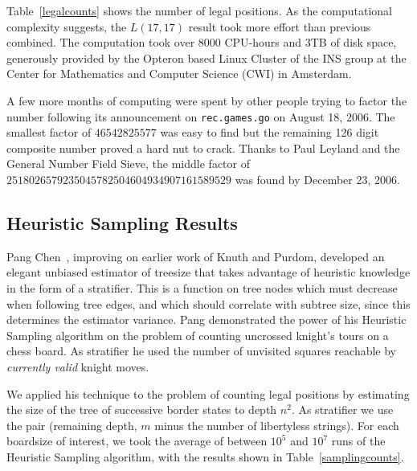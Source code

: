 \documentclass{article}
\begin{document}
Table~\ref{legalcounts} shows the number of legal positions.
As the computational complexity suggests, the $L(17,17)$ result
took more effort than previous combined.
The computation took over 8000 CPU-hours and 3TB of disk space,
generously provided by the Opteron based Linux Cluster of the INS group
at the Center for Mathematics and Computer Science (CWI) in Amsterdam.

A few more months of computing were spent by other people trying to
factor the number following its announcement on {\tt rec.games.go} on
August 18, 2006.
The smallest factor of $46542825577$ was easy to find but the remaining
126 digit composite number proved a hard nut to crack.
Thanks to Paul Leyland and the General Number Field
Sieve, the middle factor of $2518026579235045782504604934907161589529$
was found by December 23, 2006.

\subsection{Heuristic Sampling Results}
Pang Chen~\cite{C92}, improving on earlier work of Knuth and Purdom,
developed an elegant unbiased estimator of treesize that takes
advantage of heuristic knowledge in the form of a stratifier.
This is a function on tree nodes which must decrease when following
tree edges, and which should correlate with subtree size, since
this determines the estimator variance.
Pang demonstrated the power
of his Heuristic Sampling algorithm on the problem of counting
uncrossed knight's tours on a chess board.
As stratifier he used the number of unvisited squares reachable by
{\em currently valid} knight moves.

We applied his technique to the problem of counting legal positions
by estimating
the size of the tree of successive border states to depth $n^2$.
As stratifier we use the pair (remaining depth,
$m$ minus the number of libertyless strings).
For each boardsize of interest, we took the average of
between $10^5$ and $10^7$ runs of the Heuristic Sampling algorithm,
with the results shown in Table~\ref{samplingcounts}.
\end{document}
